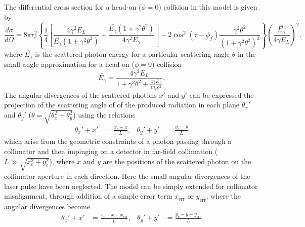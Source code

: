 \documentclass[../main.tex]{subfiles}
\begin{document}
The differential cross section for a head-on ($\phi=0$) collision in this model is given by
\begin{equation}
\frac{d\sigma}{d\Omega} = 8\pi r_{e}^{2}\left\{\frac{1}{4}\left[\frac{4\gamma^{2}E_{L}}{\bar{E_{\gamma}}\left(1+\gamma^{2}\theta^{2}\right)}+\frac{\bar{E_{\gamma}}\left(1+\gamma^{2}\theta^{2}\right)}{4\gamma^{2}E_{\gamma}}\right]-2\cos^{2}\left(\tau-\phi_{f}\right)\frac{\gamma^{2}\theta^{2}}{\left(1+\gamma^{2}\theta^{2}\right)^{2}}\right\}\left(\frac{\bar{E_{\gamma}}}{4\gamma E_{L}}\right)^{2},
\label{eq:sun_differential_cross_section}    
\end{equation}
where $\bar{E_{\gamma}}$ is the scattered photon energy for a particular scattering angle $\theta$ in the small angle approximation for a head-on ($\phi=0$) collision
\begin{equation}
\bar{E_{\gamma}} = \frac{4\gamma^{2}E_{L}}{1+\gamma^{2}\theta^{2}+\frac{4\gamma E_{L}}{m_{e}c^{2}}}.
\label{eq:sun_Egamma_bar}    
\end{equation}
The angular divergences of the scattered photons $x'$ and $y'$ can be expressed the projection of the scattering angle of of the produced radiation in each plane $\theta_{x}'$ and $\theta_{y}'$ ($\theta = \sqrt{\theta_{x}^{2}+\theta_{y}^{2}}$) using the relations
\begin{align}
\theta_{x}' + x' &= \frac{x_{c}-x}{L}, & \theta_{y}' + y' &= \frac{y_{c}-y}{L}
\label{eq:sun_angular_divergence}    
\end{align}
which arise from the geometric constraints of a photon passing through a collimator and then impinging on a detector in far-field collimation ($L \gg \sqrt{x_{c}^{2}+y_{c}^{2}}$), where $x$ and $y$ are the positions of the scattered photon on the collimator aperture in each direction. Here the small angular divergences of the laser pulse have been neglected. The model can be simply extended for collimator misalignment, through addition of a simple error term \cite{sun2009characterizations} $x_{\mathrm{err}}$ or $y_{\mathrm{err}}$, where the angular divergences become
\begin{align}
\theta_{x}' + x' &= \frac{x_{c}-x-x_{\mathrm{err}}}{L}, &
\theta_{y}' + y' &= \frac{y_{c}-y-y_{\mathrm{err}}}{L}
\label{eq:sun_collimator_misallignment}    
\end{align}
\end{document}

